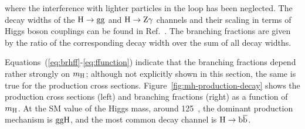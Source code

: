 % 
where the interference with lighter particles in the loop has been neglected.
% 
The decay widths of the $\mathrm{H}\to\mathrm{g}\mathrm{g}$ and $\mathrm{H}\to\mathrm{Z}\mathrm{\gamma}$ channels and their scaling in terms of Higgs boson couplings can be found in Ref.~\cite{higgshunter}.
% 
The branching fractions are given by the ratio of the corresponding decay width over the sum of all decay widths.


Equations~(\ref{eq:brhff}-\ref{eq:ffunction}) indicate that the branching fractions depend rather strongly on $m_{\mathrm{H}}$; although not explicitly shown in this section, the same is true for the production cross sections.
% 
Figure~\ref{fig:mh-production-decay} shows the production cross sections (left) and branching fractions (right) as a function of $m_{\mathrm{H}}$.
% 
At the SM value of the Higgs mass, around 125\GeV~\cite{Aad:2015zhl}, the dominant production mechanism is $\mathrm{g}\mathrm{g}\mathrm{H}$, and the most common decay channel is $\mathrm{H}\to\mathrm{b}\overline{\mathrm{b}}$.

